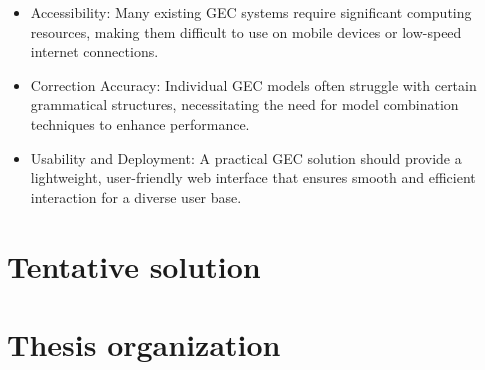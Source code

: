 \begin{itemize}
  \item Accessibility: Many existing GEC systems require significant computing resources, making them difficult to use on mobile devices or low-speed internet connections.
  \item Correction Accuracy: Individual GEC models often struggle with certain grammatical structures, necessitating the need for model combination techniques to enhance performance.
  \item Usability and Deployment: A practical GEC solution should provide a lightweight, user-friendly web interface that ensures smooth and efficient interaction for a diverse user base.
\end{itemize}

\section{Tentative solution}
\label{section:solution}

\section{Thesis organization}
\label{section:organization}
